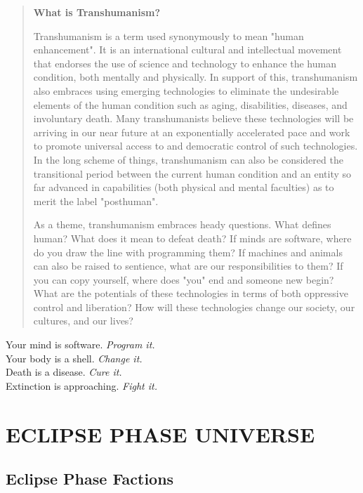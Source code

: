 \begin{quote}
   \textbf{What is Transhumanism?}

   Transhumanism is a term used synonymously to mean "human enhancement".
   It is an international cultural and intellectual movement that endorses the
   use of science and technology to enhance the human condition, both mentally
   and physically. In support of this, transhumanism also embraces using
   emerging technologies to eliminate the undesirable elements of the human
   condition such as aging, disabilities, diseases, and involuntary death. Many
   transhumanists believe these technologies will be arriving in our near future
   at an exponentially accelerated pace and work to promote universal access to
   and democratic control of such technologies. In the long scheme of things,
   transhumanism can also be considered the transitional period between the
   current human condition and an entity so far advanced in capabilities (both
   physical and mental faculties) as to merit the label "posthuman".

   As a theme, transhumanism embraces heady questions. What defines human? What
   does it mean to defeat death? If minds are software, where do you draw the
   line with programming them? If machines and animals can also be raised to
   sentience, what are our responsibilities to them? If you can copy yourself,
   where does "you" end and someone new begin? What are the potentials of these
   technologies in terms of both oppressive control and liberation? How will
   these technologies change our society, our cultures, and our lives?
\end{quote}

\begin{center}
   Your mind is software. \emph{Program it.}\\
   Your body is a shell. \emph{Change it.}\\
   Death is a disease. \emph{Cure it.}\\
   Extinction is approaching. \emph{Fight it.}\\
\end{center}


\section{ECLIPSE PHASE UNIVERSE}

\subsection{Eclipse Phase Factions}

